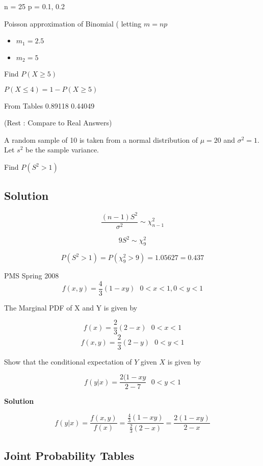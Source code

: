 \documentclass[]{report}
\begin{document}
\begin{enumerate}[(i)]
\begin{itemize}
n  = 25
p = 0.1, 0.2

Poisson approximation of Binomial ( letting $m=np$

\begin{itemize}
	\item $m_1 = 2.5$
	\item $m_2 = 5$
\end{itemize}

Find $P(X\geq 5)$ 

$ P(X\leq 4)  = 1 - P(X\geq 5) $

From Tables 
0.89118
0.44049

(Rest : Compare to Real Answers)


A random sample of 10 is taken from a normal distribution of $\mu=20$ and $\sigma^2=1$. Let $s^2$ be the sample variance.

Find $P(S^2>1)$

\subsection*{Solution}

\[ \frac{(n-1)S^2}{\sigma^2} \sim \chi^2_{n-1}\]

\[ 9S^2 \sim \chi^2_{9}\]


\[ P(S^2>1) = P(\chi^2_{9}>9) = 1.05627 = 0.437\]


PMS Spring 2008 
\[f(x,y) = \frac{4}{3}(1-xy) \mbox{   }0<x<1,0<y<1  \]

The Marginal PDF of X and Y is given by 

\[f(x) = \frac{2}{3}(2-x) \mbox{   }0<x<1 \]
\[f(x,y) = \frac{2}{3}(2-y) \mbox{   }0<y<1  \]

Show that the conditional expectation of $Y$ given $X$ is given by

\[ f(y|x) = \frac{2(1-xy}{2-7} \mbox{   }0<y<1\]

\textbf{Solution}

\[ f(y|x) = \frac{f(x,y)}{f(x)} = \frac{\frac{4}{3}(1-xy)}{\frac{2}{3}(2-x)} = \frac{2(1-xy)}{2-x}\]

\subsection{Joint Probability Tables}


\end{itemize}
\end{enumerate}
\end{document}
